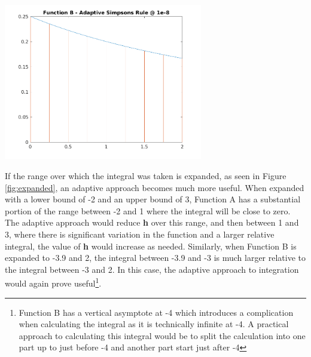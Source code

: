 \documentclass{article}
\begin{document}
\begin{center}
	\includegraphics[width=0.65\textwidth]{../output/b_adaptive_simpsons_8.png}
	\label{fig:b_adap8}
\end{center}


If the range over which the integral was taken is expanded, as seen in Figure \ref{fig:expanded}, an adaptive approach becomes much more useful. When expanded with a lower bound of -2 and an upper bound of 3, Function A has a substantial portion of the range between -2 and 1 where the integral will be close to zero. The adaptive approach would reduce \textbf{h} over this range, and then between 1 and 3,  where there is significant variation in the function and a larger relative integral, the value of \textbf{h} would increase as needed. Similarly, when Function B is expanded to -3.9 and 2, the integral between -3.9 and -3 is much larger relative to the integral between -3 and 2. In this case, the adaptive approach to integration would again prove useful\footnote{Function B has a vertical asymptote at -4 which introduces a complication when calculating the integral as it is technically infinite at -4. A practical approach to calculating this integral would be to split the calculation into one part up to just before -4 and another part start just after -4}.
\end{document}
